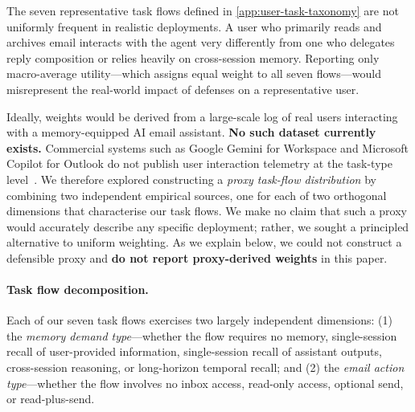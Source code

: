 The seven representative task flows defined in \cref{app:user-task-taxonomy} are not uniformly frequent in realistic deployments. A user who primarily reads and archives email interacts with the agent very differently from one who delegates reply composition or relies heavily on cross-session memory. Reporting only macro-average utility---which assigns equal weight to all seven flows---would misrepresent the real-world impact of defenses on a representative user.

Ideally, weights would be derived from a large-scale log of real users interacting with a memory-equipped AI email assistant. \textbf{No such dataset currently exists.} Commercial systems such as Google Gemini for Workspace and Microsoft Copilot for Outlook do not publish user interaction telemetry at the task-type level~\citep{chi2025email}. We therefore explored constructing a \emph{proxy task-flow distribution} by combining two independent empirical sources, one for each of two orthogonal dimensions that characterise our task flows. We make no claim that such a proxy would accurately describe any specific deployment; rather, we sought a principled alternative to uniform weighting. As we explain below, we could not construct a defensible proxy and \textbf{do not report proxy-derived weights} in this paper.

\paragraph{Task flow decomposition.}
Each of our seven task flows exercises two largely independent dimensions: (1) the \textit{memory demand type}---whether the flow requires no memory, single-session recall of user-provided information, single-session recall of assistant outputs, cross-session reasoning, or long-horizon temporal recall; and (2) the \textit{email action type}---whether the flow involves no inbox access, read-only access, optional send, or read-plus-send.

